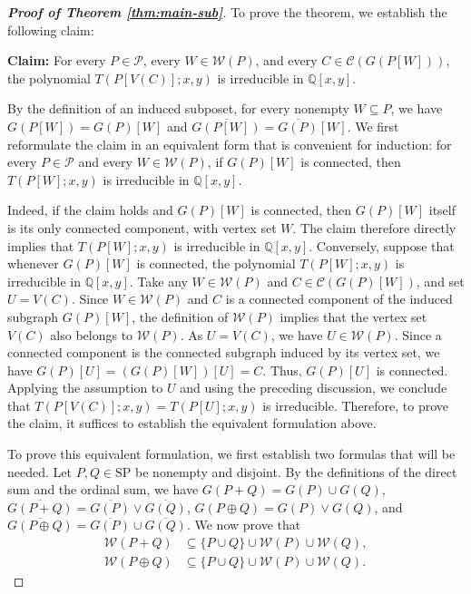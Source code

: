 \documentclass[10pt,a4paper]{amsart}
\begin{document}
\begin{proof}[\rm\textbf{Proof of Theorem \ref{thm:main-sub}}]
To prove the theorem, we establish the following claim:

\textbf{Claim:}
For every $P\in\mathcal P$, every $W\in\mathcal W(P)$, and every $C\in\mathcal C(G(P[W]))$,
the polynomial $T(P[V(C)];x,y)$ is irreducible in $\mathbb Q[x,y]$.

By the definition of an induced subposet, for every nonempty $W\subseteq P$, 
we have $G(P[W])=G(P)[W]$ and $\overline{G(P[W])}=\overline{G(P)}[W]$.
We first reformulate the claim in an equivalent form that is convenient for induction:
for every $P\in\mathcal P$ and every $W\in\mathcal W(P)$,
if $G(P)[W]$ is connected, then $T(P[W];x,y)$ is irreducible in $\mathbb Q[x,y]$.

Indeed, if the claim holds and $G(P)[W]$ is connected,
then $G(P)[W]$ itself is its only connected component, with vertex set $W$.
The claim therefore directly implies that $T(P[W];x,y)$ is irreducible in $\mathbb Q[x,y]$.
Conversely, suppose that whenever $G(P)[W]$ is connected,
the polynomial $T(P[W];x,y)$ is irreducible in $\mathbb Q[x,y]$.
Take any $W\in\mathcal W(P)$ and $C\in\mathcal C(G(P)[W])$, and set $U=V(C)$.
Since $W\in\mathcal W(P)$ and $C$ is a connected component of the induced subgraph $G(P)[W]$,
the definition of $\mathcal W(P)$ implies that the vertex set $V(C)$ also belongs to $\mathcal W(P)$.
As $U=V(C)$, we have $U\in\mathcal W(P)$.
Since a connected component is the connected subgraph induced by its vertex set, 
we have $G(P)[U]=(G(P)[W])[U]=C$.
Thus, $G(P)[U]$ is connected.
Applying the assumption to $U$ and using the preceding discussion,
we conclude that $T(P[V(C)];x,y)=T(P[U];x,y)$ is irreducible.
Therefore, to prove the claim, it suffices to establish the equivalent formulation above.

To prove this equivalent formulation,
we first establish two formulas that will be needed.
Let $P,Q\in\mathrm{SP}$ be nonempty and disjoint.
By the definitions of the direct sum and the ordinal sum, we have
$G(P+Q)=G(P)\cup G(Q)$, $\overline{G(P+Q)}=\overline{G(P)}\vee\overline{G(Q)}$,
$G(P\oplus Q)=G(P)\vee G(Q)$, and $\overline{G(P\oplus Q)}=\overline{G(P)}\cup\overline{G(Q)}$.
We now prove that
\begin{align}
\mathcal W(P+Q)
&\subseteq\{P\cup Q\}\cup\mathcal W(P)\cup\mathcal W(Q),\label{eq:cor3343-W-direct}\\
\mathcal W(P\oplus Q)
&\subseteq\{P\cup Q\}\cup\mathcal W(P)\cup\mathcal W(Q).\label{eq:cor3343-W-ordinal}
\end{align}


\end{proof}
\end{document}
